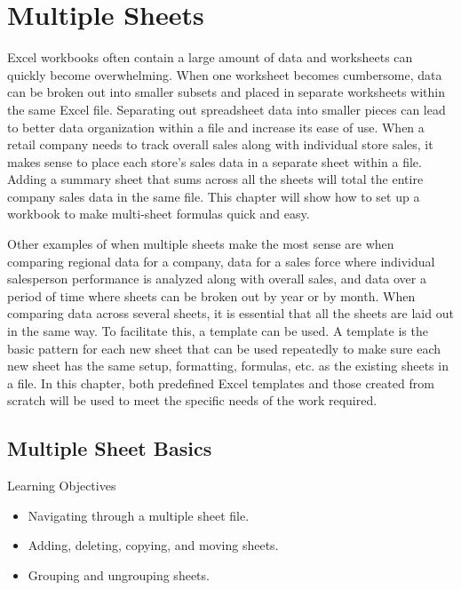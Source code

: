 \chapter{Multiple Sheets}\label{ch06:sheets}

Excel workbooks often contain a large amount of data and worksheets can quickly become overwhelming. When one worksheet becomes cumbersome, data can be broken out into smaller subsets and placed in separate worksheets within the same Excel file. Separating out spreadsheet data into smaller pieces can lead to better data organization within a file and increase its ease of use. When a retail company needs to track overall sales along with individual store sales, it makes sense to place each store's sales data in a separate sheet within a file. Adding a summary sheet that sums across all the sheets will total the entire company sales data in the same file. This chapter will show how to set up a workbook to make multi-sheet formulas quick and easy.

Other examples of when multiple sheets make the most sense are when comparing regional data for a company, data for a sales force where individual salesperson performance is analyzed along with overall sales, and data over a period of time where sheets can be broken out by year or by month. When comparing data across several sheets, it is essential that all the sheets are laid out in the same way. To facilitate this, a template can be used. A template is the basic pattern for each new sheet that can be used repeatedly to make sure each new sheet has the same setup, formatting, formulas, etc. as the existing sheets in a file. In this chapter, both predefined Excel templates and those created from scratch will be used to meet the specific needs of the work required.

\section{Multiple Sheet Basics}

\begin{center}
	\begin{objbox}{Learning Objectives}
		\begin{itemize}
			\setlength{\itemsep}{0pt}
			\setlength{\parskip}{0pt}
			\setlength{\parsep}{0pt}
			
			\item Navigating through a multiple sheet file.
			\item Adding, deleting, copying, and moving sheets.
			\item Grouping and ungrouping sheets.

		\end{itemize}
	\end{objbox}
\end{center}

